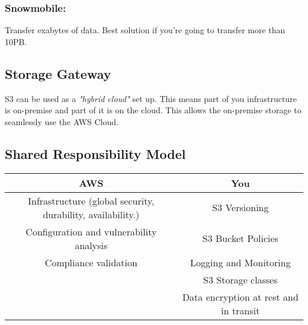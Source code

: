 \subsubsection{Snowmobile:} Transfer exabytes of data.
Best solution if you're going to transfer more than 10PB\@.

\subsection{Storage Gateway}\label{subsec:storage-gateway}
S3 can be used as a \textit{"hybrid cloud"} set up.
This means part of you infrastructure is on-premise and part of it is on the cloud.
This allows the on-premise storage to seamlessly use the AWS Cloud.

\pagebreak

\subsection{Shared Responsibility Model}\label{subsec:shared-responsibility-model}
\begin{table}[h]
	\centering
	\begin{tabular}{||c c||}
		\hline
		\multicolumn{1}{||c|}{\textbf{AWS}}                                						& \textbf{You} \\ \hline
		\multicolumn{1}{||c|}{Infrastructure (global security, durability, availability.)}    	& S3 Versioning \\ \hline
		\multicolumn{1}{||c|}{Configuration and vulnerability analysis}    						& S3 Bucket Policies \\ \hline
		\multicolumn{1}{||c|}{Compliance validation}                    						& Logging and Monitoring \\ \hline
		\multicolumn{1}{||c|}{}												        			& S3 Storage classes \\ \hline
		\multicolumn{1}{||c|}{}       															& Data encryption at rest and in transit \\ \hline
	\end{tabular}
	\newline\newline
	\label{tab:shared-responsibility-model-table}
\end{table}

